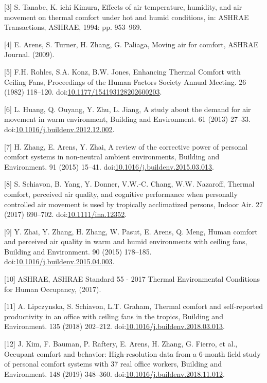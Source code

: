 \documentclass[]{elsarticle} %
\begin{document}
\hypertarget{ref-tanabeEffectsAirTemperature1994a}{}
{[}3{]} S. Tanabe, K. ichi Kimura, Effects of air temperature, humidity,
and air movement on thermal comfort under hot and humid conditions, in:
ASHRAE Transactions, ASHRAE, 1994: pp. 953--969.

\hypertarget{ref-arensMovingAirComfort2009}{}
{[}4{]} E. Arens, S. Turner, H. Zhang, G. Paliaga, Moving air for
comfort, ASHRAE Journal. (2009).

\hypertarget{ref-rohlesEnhancingThermalComfort1982}{}
{[}5{]} F.H. Rohles, S.A. Konz, B.W. Jones, Enhancing Thermal Comfort
with Ceiling Fans, Proceedings of the Human Factors Society Annual
Meeting. 26 (1982) 118--120.
doi:\href{https://doi.org/10.1177/154193128202600203}{10.1177/154193128202600203}.

\hypertarget{ref-huangStudyDemandAir2013}{}
{[}6{]} L. Huang, Q. Ouyang, Y. Zhu, L. Jiang, A study about the demand
for air movement in warm environment, Building and Environment. 61
(2013) 27--33.
doi:\href{https://doi.org/10.1016/j.buildenv.2012.12.002}{10.1016/j.buildenv.2012.12.002}.

\hypertarget{ref-zhangReviewCorrectivePower2015a}{}
{[}7{]} H. Zhang, E. Arens, Y. Zhai, A review of the corrective power of
personal comfort systems in non-neutral ambient environments, Building
and Environment. 91 (2015) 15--41.
doi:\href{https://doi.org/10.1016/j.buildenv.2015.03.013}{10.1016/j.buildenv.2015.03.013}.

\hypertarget{ref-schiavonThermalComfortPerceived2017}{}
{[}8{]} S. Schiavon, B. Yang, Y. Donner, V.W.-C. Chang, W.W. Nazaroff,
Thermal comfort, perceived air quality, and cognitive performance when
personally controlled air movement is used by tropically acclimatized
persons, Indoor Air. 27 (2017) 690--702.
doi:\href{https://doi.org/10.1111/ina.12352}{10.1111/ina.12352}.

\hypertarget{ref-zhaiHumanComfortPerceived2015a}{}
{[}9{]} Y. Zhai, Y. Zhang, H. Zhang, W. Pasut, E. Arens, Q. Meng, Human
comfort and perceived air quality in warm and humid environments with
ceiling fans, Building and Environment. 90 (2015) 178--185.
doi:\href{https://doi.org/10.1016/j.buildenv.2015.04.003}{10.1016/j.buildenv.2015.04.003}.

\hypertarget{ref-ashraeASHRAEStandard552017}{}
{[}10{]} ASHRAE, ASHRAE Standard 55 - 2017 Thermal Environmental
Conditions for Human Occupancy, (2017).

\hypertarget{ref-lipczynskaThermalComfortSelfreported2018}{}
{[}11{]} A. Lipczynska, S. Schiavon, L.T. Graham, Thermal comfort and
self-reported productivity in an office with ceiling fans in the
tropics, Building and Environment. 135 (2018) 202--212.
doi:\href{https://doi.org/10.1016/j.buildenv.2018.03.013}{10.1016/j.buildenv.2018.03.013}.

\hypertarget{ref-kimOccupantComfortBehavior2019a}{}
{[}12{]} J. Kim, F. Bauman, P. Raftery, E. Arens, H. Zhang, G. Fierro,
et al., Occupant comfort and behavior: High-resolution data from a
6-month field study of personal comfort systems with 37 real office
workers, Building and Environment. 148 (2019) 348--360.
doi:\href{https://doi.org/10.1016/j.buildenv.2018.11.012}{10.1016/j.buildenv.2018.11.012}.
\end{document}
